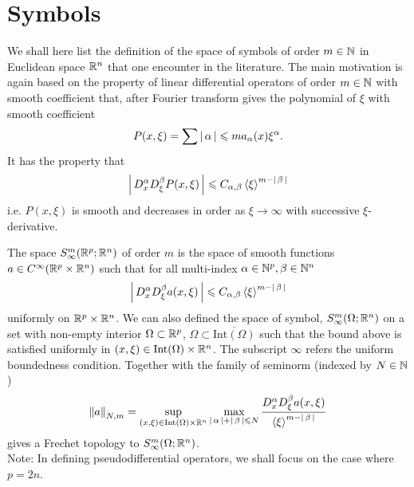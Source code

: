 \documentclass{article}
\begin{document}
\section{Symbols}
We shall here list the definition of the space of symbols of order $m \in \N$  in Euclidean space $\R^n$ that one encounter in the literature. The main motivation is again based on the property of linear differential operators of order $m \in \N$ with smooth coefficient that, after Fourier transform gives the polynomial of $\xi$ with smooth coefficient 
\begin{align*}
P(x, \xi) = \sum{\abs{\alpha} \leq m} a_\alpha(x) \xi^\alpha. 
\end{align*}
It has the property that 
\begin{align*}
\abs{D^\alpha_x D^\beta_\xi P(x, \xi)} \leq C_{\alpha, \beta} \sym[\xi]^{m - \abs{\beta}} 
\end{align*}
i.e. $P(x, \xi)$ is smooth and decreases in order as $\xi \to \infty$ with successive $\xi$-derivative. 


\begin{fdefinition}
    The space $S^m_\infty(\R^p; \R^n)$ of order $m$ is the space of smooth functions $a \in C^\infty(\R^p \times \R^n)$ such that for all multi-index $\alpha \in \N^p, \beta \in \N^n$
    \begin{align*}
    \abs{D^\alpha_x D^\beta_\xi a (x, \xi)} \leq C_{\alpha, \beta} \sym[\xi]^{m - \abs{\beta}} 
    \end{align*}
    uniformly on $\R^p \times \R^n$. We can also defined the space of symbol, $S^m_\infty(\Omega; \R^n)$ on a set with non-empty interior $\Omega \subset \R^p$, $\Omega \subset \overline{\mathrm{Int}(\Omega)}$ such that the bound above is satisfied uniformly in $(x, \xi) \in \mathrm{Int}(\Omega) \times \R^n$. The subscript $\infty$ refers the uniform boundedness condition. Together with the family of seminorm (indexed by $N \in \N$) 
    \begin{align*}
    \norm[a]_{N, m} = \sup_{(x, \xi) \in \mathrm{Int}(\Omega) \times \R^n} \max_{\abs{\alpha} + \abs{\beta} \leq N} \frac{D^\alpha_x D^\beta_\xi a(x, \xi)}{\sym[\xi]^{m - \abs{\beta}}} 
    \end{align*}
    gives a Frechet topology to $S^m_\infty(\Omega; \R^n)$. \\
    
    Note: In defining pseudodifferential operators, we shall focus on the case where $p = 2n$.
\end{fdefinition}
\end{document}
